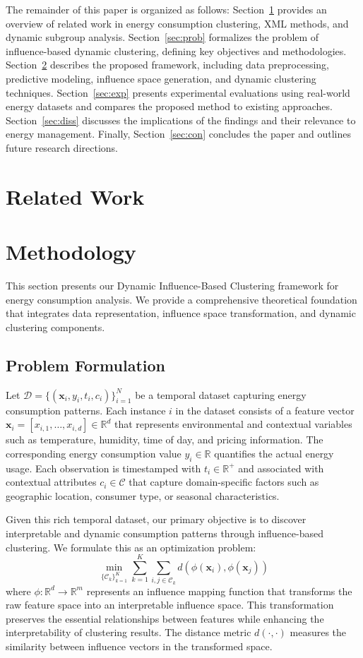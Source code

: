 \documentclass[final,5p,times,twocolumn,numbers]{elsarticle}
\begin{document}
The remainder of this paper is organized as follows: Section~\ref{sec:related_work} provides an overview of related work in energy consumption clustering, XML methods, and dynamic subgroup analysis. Section~\ref{sec:prob} formalizes the problem of influence-based dynamic clustering, defining key objectives and methodologies. Section~\ref{sec:methodology} describes the proposed framework, including data preprocessing, predictive modeling, influence space generation, and dynamic clustering techniques. Section~\ref{sec:exp} presents experimental evaluations using real-world energy datasets and compares the proposed method to existing approaches. Section~\ref{sec:diss} discusses the implications of the findings and their relevance to energy management. Finally, Section~\ref{sec:con} concludes the paper and outlines future research directions.
\section{Related Work}
\label{sec:related_work}
\section{Methodology}
\label{sec:methodology}
This section presents our Dynamic Influence-Based Clustering framework for energy consumption analysis. We provide a comprehensive theoretical foundation that integrates data representation, influence space transformation, and dynamic clustering components.

\subsection{Problem Formulation}
Let $\mathcal{D} = \{ (\mathbf{x}_i, y_i, t_i, c_i) \}_{i=1}^N$ be a temporal dataset capturing energy consumption patterns. Each instance $i$ in the dataset consists of a feature vector $\mathbf{x}_i = [x_{i,1}, \ldots, x_{i,d}] \in \mathbb{R}^d$ that represents environmental and contextual variables such as temperature, humidity, time of day, and pricing information. The corresponding energy consumption value $y_i \in \mathbb{R}$ quantifies the actual energy usage. Each observation is timestamped with $t_i \in \mathbb{R}^+$ and associated with contextual attributes $c_i \in \mathcal{C}$ that capture domain-specific factors such as geographic location, consumer type, or seasonal characteristics.

Given this rich temporal dataset, our primary objective is to discover interpretable and dynamic consumption patterns through influence-based clustering. We formulate this as an optimization problem:
\begin{equation}
    \min_{\{\mathcal{C}_k\}_{k=1}^K} \sum_{k=1}^K \sum_{i,j \in \mathcal{C}_k} d(\phi(\mathbf{x}_i), \phi(\mathbf{x}_j))
\end{equation}
where $\phi: \mathbb{R}^d \to \mathbb{R}^m$ represents an influence mapping function that transforms the raw feature space into an interpretable influence space. This transformation preserves the essential relationships between features while enhancing the interpretability of clustering results. The distance metric $d(\cdot,\cdot)$ measures the similarity between influence vectors in the transformed space.
\end{document}
